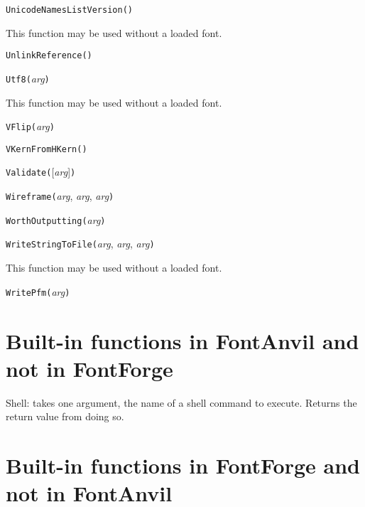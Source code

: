 
\noindent\texttt{UnicodeNamesListVersion(}\texttt{)}

This function may be used without a loaded font.


\noindent\texttt{UnlinkReference(}\texttt{)}


\noindent\texttt{Utf8(}\textit{arg}\texttt{)}

This function may be used without a loaded font.


\noindent\texttt{VFlip(}\textit{arg}\texttt{)}


\noindent\texttt{VKernFromHKern(}\texttt{)}


\noindent\texttt{Validate(}[\textit{arg}]\texttt{)}


\noindent\texttt{Wireframe(}\textit{arg}, \textit{arg}, \textit{arg}\texttt{)}


\noindent\texttt{WorthOutputting(}\textit{arg}\texttt{)}


\noindent\texttt{WriteStringToFile(}\textit{arg}, \textit{arg}, \textit{arg}\texttt{)}

This function may be used without a loaded font.


\noindent\texttt{WritePfm(}\textit{arg}\texttt{)}

\section{Built-in functions in FontAnvil and not in FontForge}


Shell:  takes one argument, the name of a shell command to execute.  Returns
the return value from doing so.

\section{Built-in functions in FontForge and not in FontAnvil}

